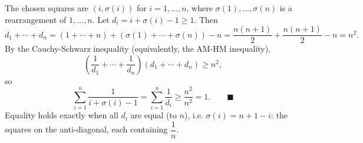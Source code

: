 The chosen squares are $(i,\sigma(i))$ for $i=1,\dots,n$, where $\sigma(1),\dots,\sigma(n)$ is a rearrangement of $1,\dots,n$. Let $d_i=i+\sigma(i)-1\ge1$. Then
\[d_1+\cdots+d_n=(1+\cdots+n)+(\sigma(1)+\cdots+\sigma(n))-n=\dfrac{n(n+1)}{2}+\dfrac{n(n+1)}{2}-n=n^2.\]
By the Cauchy-Schwarz inequality (equivalently, the AM-HM inequality),
\[\left(\dfrac1{d_1}+\cdots+\dfrac1{d_n}\right)\left(d_1+\cdots+d_n\right)\ge n^2,\]
so
\[\sum_{i=1}^{n}\dfrac{1}{i+\sigma(i)-1}=\sum_{i=1}^n\dfrac1{d_i}\ge\dfrac{n^2}{n^2}=1.\qquad\blacksquare\]
Equality holds exactly when all $d_i$ are equal (to $n$), i.e. $\sigma(i)=n+1-i$: the squares on the anti-diagonal, each containing $\dfrac1n$.
